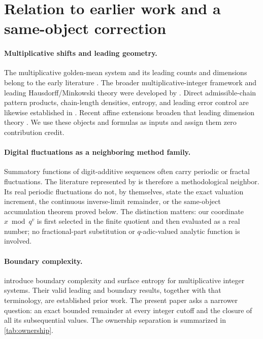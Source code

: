\section{Relation to earlier work and a same-object correction}
\label{sec:prior}

\paragraph{Multiplicative shifts and leading geometry.}
The multiplicative golden-mean system and its leading counts and dimensions
belong to the early literature \citep{fan2012level}.  The broader
multiplicative-integer framework and leading Hausdorff/Minkowski theory were
developed by \citet{kenyon2012hausdorff}.  Direct admissible-chain pattern
products, chain-length densities, entropy, and leading error control are
likewise established in \citet{ban2019pattern}.  Recent affine extensions
broaden that leading dimension theory \citep{ban2025affine}.  We use these
objects and formulas as inputs and assign them zero contribution credit.

\paragraph{Digital fluctuations as a neighboring method family.}
Summatory functions of digit-additive sequences often carry periodic or
fractal fluctuations.  The literature represented by
\citet{madritsch2012summatory} is therefore a methodological neighbor.
Its real periodic fluctuations do not, by themselves, state the exact
valuation increment, the continuous inverse-limit remainder, or the
same-object accumulation theorem proved below.  The distinction matters:
our coordinate \(x\bmod q^v\) is first selected in the finite quotient and
then evaluated as a real number; no fractional-part substitution or
\(q\)-adic-valued analytic function is involved.

\paragraph{Boundary complexity.}
\citet{ban2023boundary} introduce boundary complexity and surface entropy
for multiplicative integer systems.  Their valid leading and boundary
results, together with that terminology, are established prior work.  The present
paper asks a narrower question: an exact bounded remainder at every integer
cutoff and the closure of all its subsequential values.  The ownership
separation is summarized in \cref{tab:ownership}.

